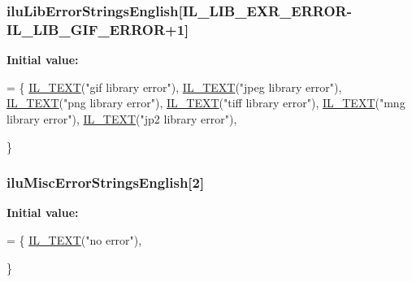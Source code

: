 \hypertarget{ilu__err-english_8h_ad9e38a00be7c1aaef7f92a02e47a8f24}{
\subsubsection[{ilu\-Lib\-Error\-Strings\-English}]{ ilu\-Lib\-Error\-Strings\-English\mbox{[}{\bf I\-L\-\_\-\-L\-I\-B\-\_\-\-E\-X\-R\-\_\-\-E\-R\-R\-O\-R}-\/{\bf I\-L\-\_\-\-L\-I\-B\-\_\-\-G\-I\-F\-\_\-\-E\-R\-R\-O\-R}+1\mbox{]}}}\label{ilu__err-english_8h_ad9e38a00be7c1aaef7f92a02e47a8f24}
{\bfseries Initial value\-:}
\begin{DoxyCode}
= \{
    \hyperlink{il_8h_a2907c2129d2ba2ebbae6aa6a69b7f685}{IL\_TEXT}(\textcolor{stringliteral}{"gif library error"}),
    \hyperlink{il_8h_a2907c2129d2ba2ebbae6aa6a69b7f685}{IL\_TEXT}(\textcolor{stringliteral}{"jpeg library error"}),
    \hyperlink{il_8h_a2907c2129d2ba2ebbae6aa6a69b7f685}{IL\_TEXT}(\textcolor{stringliteral}{"png library error"}),
    \hyperlink{il_8h_a2907c2129d2ba2ebbae6aa6a69b7f685}{IL\_TEXT}(\textcolor{stringliteral}{"tiff library error"}),
    \hyperlink{il_8h_a2907c2129d2ba2ebbae6aa6a69b7f685}{IL\_TEXT}(\textcolor{stringliteral}{"mng library error"}),
    \hyperlink{il_8h_a2907c2129d2ba2ebbae6aa6a69b7f685}{IL\_TEXT}(\textcolor{stringliteral}{"jp2 library error"}),

\}
\end{DoxyCode}
\hypertarget{ilu__err-english_8h_a594d413e6a84713a0cc941e95b61650d}{
\subsubsection[{ilu\-Misc\-Error\-Strings\-English}]{ ilu\-Misc\-Error\-Strings\-English\mbox{[}2\mbox{]}}}\label{ilu__err-english_8h_a594d413e6a84713a0cc941e95b61650d}
{\bfseries Initial value\-:}
\begin{DoxyCode}
= \{
    \hyperlink{il_8h_a2907c2129d2ba2ebbae6aa6a69b7f685}{IL\_TEXT}(\textcolor{stringliteral}{"no error"}),

\}
\end{DoxyCode}

